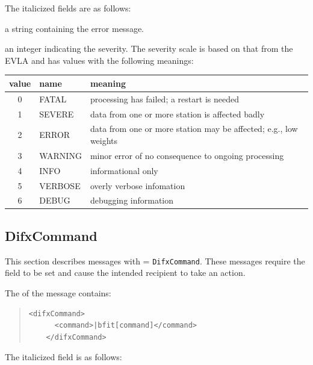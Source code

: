 \noindent The italicized fields are as follows:

\begin{description}
\item{} a string containing the error message.
\item{} an integer indicating the severity. 
The severity scale is based on that from the EVLA and has values with the following meanings:

\begin{tabular}{cll}
value    & name & meaning \\
\hline
0 & FATAL   & processing has failed; a restart is needed  \\
1 & SEVERE  & data from one or more station is affected badly \\
2 & ERROR   & data from one or more station may be affected; e.g., low weights \\
3 & WARNING & minor error of no consequence to ongoing processing \\
4 & INFO    & informational only \\
5 & VERBOSE & overly verbose infomation \\
6 & DEBUG   & debugging information 
\end{tabular}

\end{description}







\subsection{DifxCommand}

This section describes messages with  = {\tt DifxCommand}.
These messages require the  field to be set and cause the intended recipient to take an action.

The  of the message contains:

\begin{quotation} 
\begin{Verbatim}[commandchars=\|\[\]] 
    <difxCommand>
      <command>|bfit[command]</command>
    </difxCommand>
\end{Verbatim}
\end{quotation}

\noindent The italicized field is as follows:

